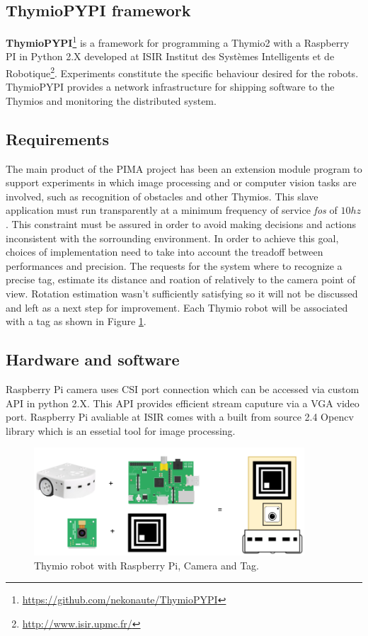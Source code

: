 \documentclass[a4paper]{report}
\begin{document}
\subsection{ThymioPYPI framework}
\textbf{ThymioPYPI}\footnote{\url{https://github.com/nekonaute/ThymioPYPI}} is a framework for programming a Thymio2 with a Raspberry PI in Python 2.X developed at ISIR Institut des Systèmes Intelligents
et de Robotique\footnote{\url{http://www.isir.upmc.fr/}}. 
Experiments constitute the specific behaviour desired for the robots.
ThymioPYPI provides a network infrastructure for shipping software to the Thymios and monitoring the distributed system.

\subsection{Requirements}
The main product of the PIMA project has been an extension module program to support experiments in which image processing and or computer vision tasks are involved, such as recognition of obstacles and other Thymios. This slave application must run transparently at a minimum frequency of service \textit{fos} of \textbf{$10 hz$}. This constraint must be assured in order to avoid making decisions and actions inconsistent with the sorrounding environment. In order to achieve this goal, choices of implementation need to take into account the treadoff between performances and precision. The requests for the system where to recognize a precise tag, estimate its distance and roation of relatively to the camera point of view.
Rotation estimation wasn't sufficiently satisfying so it will not be discussed and left as a next step for improvement. Each Thymio robot will be associated with a tag as shown in Figure \ref{fig:thy}.

\subsection{Hardware and software}
Raspberry Pi camera uses CSI port connection which can be accessed via custom API in python 2.X. This API provides efficient stream caputure via a VGA video port. Raspberry Pi avaliable at ISIR comes with a built from source 2.4 Opencv\cite{OpenCV} library which is an essetial tool for image processing.

\begin{figure}[H]
\centering
\includegraphics[width=0.9\textwidth]{standalone.png}
\caption{Thymio robot with Raspberry Pi, Camera and Tag.}
\label{fig:thy}
\end{figure}
\end{document}
